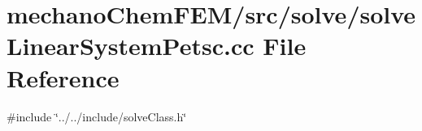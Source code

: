 \section{mechano\+Chem\+F\+E\+M/src/solve/solve\+Linear\+System\+Petsc.cc File Reference}
\label{solve_linear_system_petsc_8cc}
{\ttfamily \#include \char`\"{}../../include/solve\+Class.\+h\char`\"{}}\newline
